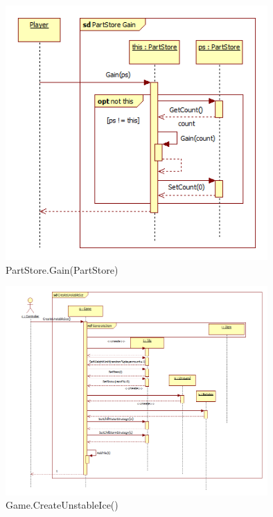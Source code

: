 \begin{figure}[H]
	\begin{center}
		\includegraphics[width=10cm]{chapters/chapter03/seqdiag/PartStore_Gain.png}
		\caption{PartStore.Gain(PartStore)}
		\label{fig:PartStoreGain}
	\end{center}
\end{figure}
\begin{figure}[H]
	\begin{center}
		\includegraphics[width=10cm]{chapters/chapter03/seqdiag/Game_CreateUnstableIce.png}
		\caption{Game.CreateUnstableIce()}
		\label{fig:GameCreateUnstableIce}
	\end{center}
\end{figure}
